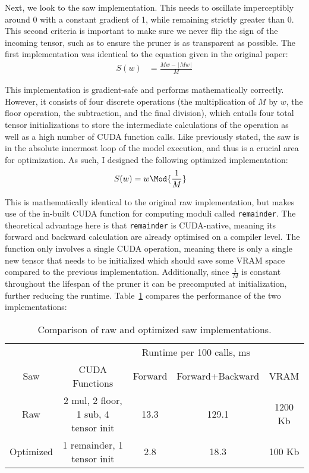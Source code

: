Next, we look to the saw implementation. This needs to oscillate imperceptibly around 0 with a constant gradient of 1,
while remaining strictly greater than 0. This second criteria is important to make sure we never flip the sign of the incoming tensor,
such as to ensure the pruner is as transparent as possible. The first implementation was identical to the equation
given in the original paper:
\begin{align}
	S(w) &= \frac{M w - \lfloor M w \rfloor}{M} \label{eq:rawsaw}
\end{align}

This implementation is gradient-safe and performs mathematically correctly. However, it consists of four discrete operations
(the multiplication of $M$ by $w$, the floor operation, the subtraction, and the final division), which entails four total
tensor initializations to store the intermediate calculations of the operation as well as a high number of CUDA function calls.
Like previously stated, the saw is in the absolute innermost loop of the model execution, and thus is a crucial area for optimization.
As such, I designed the following optimized implementation:
\begin{align}
	S(w) &= w\Mod{\frac{1}{M}} \label{eq:optsaw}
\end{align}

This is mathematically identical to the original raw implementation, but makes use of the in-built CUDA function for computing
moduli called \texttt{remainder}. The theoretical advantage here is that \texttt{remainder} is CUDA-native, meaning its forward
and backward calculation are already optimised on a compiler level. The function only involves a single CUDA operation,
meaning there is only a single new tensor that needs to be initialized which should save some VRAM space compared to the
previous implementation. Additionally, since $\frac{1}{M}$ is constant throughout the lifespan of the pruner it
can be precomputed at initialization, further reducing the runtime. Table~\ref{tab:saw_implementations}
compares the performance of the two implementations:

\begin{table}[h]
\begin{center}
\begin{tabular}{c|c|c|c|c}
& & \multicolumn{2}{c|}{Runtime per 100 calls, ms} &  \\
Saw & CUDA Functions & Forward & Forward+Backward & VRAM\\
		  \hline
Raw		& 2 mul, 2 floor, 1 sub, 4 tensor init & 13.3 & 129.1 & 1200 Kb\\
Optimized     & 1 remainder, 1 tensor init & 2.8 & 18.3 & 100 Kb\\
\end{tabular}
\end{center}
\caption{Comparison of raw and optimized saw implementations.}
\label{tab:saw_implementations}
\end{table}

